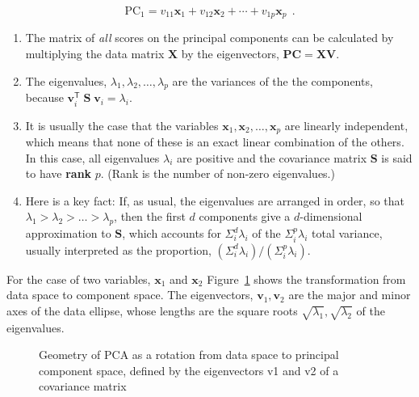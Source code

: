 \documentclass[
  letterpaper,
  10pt,
  krantz2]{krantz}
\begin{document}
\[
\text{PC}_1 = v_{11} \mathbf{x}_1 + v_{12} \mathbf{x}_2 + \cdots + v_{1p} \mathbf{x}_p \:\: .
\]

\begin{enumerate}
\def\labelenumi{\arabic{enumi}.}
\setcounter{enumi}{3}
\item
  The matrix of \emph{all} scores on the principal components can be
  calculated by multiplying the data matrix \(\mathbf{X}\) by the
  eigenvectors, \(\mathbf{PC} = \mathbf{X} \mathbf{V}\).
\item
  The eigenvalues, \(\lambda_1, \lambda_2, \dots, \lambda_p\) are the
  variances of the the components, because
  \(\mathbf{v}_i^\mathsf{T} \;\mathbf{S} \; \mathbf{v}_i = \lambda_i\).
\item
  It is usually the case that the variables
  \(\mathbf{x}_1, \mathbf{x}_2, \dots, \mathbf{x}_p\) are linearly
  independent, which means that none of these is an exact linear
  combination of the others. In this case, all eigenvalues \(\lambda_i\)
  are positive and the covariance matrix \(\mathbf{S}\) is said to have
  \textbf{rank} \(p\). (Rank is the number of non-zero eigenvalues.)
\item
  Here is a key fact: If, as usual, the eigenvalues are arranged in
  order, so that \(\lambda_1 > \lambda_2 > \dots > \lambda_p\), then the
  first \(d\) components give a \(d\)-dimensional approximation to
  \(\mathbf{S}\), which accounts for \(\Sigma_i^d \lambda_i\) of the
  \(\Sigma_i^p \lambda_i\) total variance, usually interpreted as the
  proportion, \((\Sigma_i^d \lambda_i) / (\Sigma_i^p \lambda_i)\).
\end{enumerate}

For the case of two variables, \(\mathbf{x}_1\) and \(\mathbf{x}_2\)
Figure~\ref{fig-pca-rotation} shows the transformation from data space
to component space. The eigenvectors, \(\mathbf{v}_1, \mathbf{v}_2\) are
the major and minor axes of the data ellipse, whose lengths are the
square roots \(\sqrt{\lambda_1}, \sqrt{\lambda_2}\) of the eigenvalues.

\begin{figure}


\caption{\label{fig-pca-rotation}Geometry of PCA as a rotation from data
space to principal component space, defined by the eigenvectors v1 and
v2 of a covariance matrix}

\end{figure}%
\end{document}
